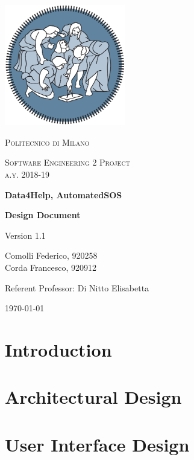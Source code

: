 \documentclass{report}
\author{Federico Comolli
        \and
        Francesco Corda}
\date{October 2018}
\begin{document}
\begin{titlepage}
	\centering
	\includegraphics[width=150pt]{images/polimi_logo}\par\vspace{1cm}
	{\scshape\LARGE
		Politecnico di Milano\par}
	\vspace{1cm}
	{\scshape\Large
		Software Engineering 2 Project\\
		a.y. 2018-19\par}
	\vspace{1.5cm}
	{\huge\bfseries
		Data4Help, AutomatedSOS\\\par}
	{\Large\bfseries
		Design Document\par}
	Version 1.1\par
	\vspace{2cm}
	{\Large
		Comolli Federico, 920258\\
	    Corda Francesco, 920912\par}
	\vfill
	Referent Professor: Di Nitto Elisabetta\par
	\vfill
	{\large\today\par}
\end{titlepage}


\renewcommand{\contentsname}{Table of Contents}
\tableofcontents

\chapter{Introduction}


\chapter{Architectural Design}


\chapter{User Interface Design}

\end{document}
